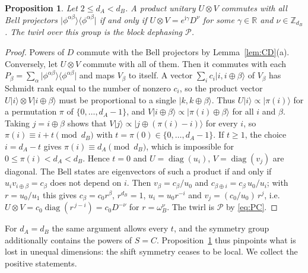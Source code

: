 \documentclass[11pt,a4paper]{article}
\newtheorem{proposition}[theorem]{Proposition}
\theoremstyle{definition}
\theoremstyle{remark}
\newcommand{\ket}[1]{\lvert #1\rangle}
\newcommand{\ketbra}[2]{\lvert #1\rangle\langle #2\rvert}
\newcommand{\dA}{d_A}
\newcommand{\dB}{d_B}
\newcommand{\wB}{\omega_B}
\newcommand{\cP}{\mathcal{P}}
\newcommand{\phib}[2]{\phi^{#1#2}}
\begin{document}
\begin{proposition}\label{prop:sym}
Let $2\le\dA<\dB$. A product unitary $U\otimes V$ commutes with all Bell projectors
$\ketbra{\phib\alpha\beta}{\phib\alpha\beta}$ if and only if
$U\otimes V=e^{\mathrm{i}\gamma}D^{\nu}$ for some $\gamma\in\mathbb{R}$ and
$\nu\in\mathbb{Z}_{\dB}$. The twirl over this group is the block dephasing $\cP$.
\end{proposition}

\begin{proof}
Powers of $D$ commute with the Bell projectors by Lemma~\ref{lem:CD}(a). Conversely, let
$U\otimes V$ commute with all of them. Then it commutes with each
$P_\beta=\sum_\alpha\ketbra{\phib\alpha\beta}{\phib\alpha\beta}$ and maps $V_\beta$ to
itself. A vector $\sum_ic_i\ket{i,i\oplus\beta}$ of $V_\beta$ has Schmidt rank equal to the
number of nonzero $c_i$, so the product vector $U\ket i\otimes V\ket{i\oplus\beta}$ must be
proportional to a single $\ket{k,k\oplus\beta}$. Thus $U\ket i\propto\ket{\pi(i)}$ for a
permutation $\pi$ of $\{0,\dots,\dA-1\}$, and
$V\ket{i\oplus\beta}\propto\ket{\pi(i)\oplus\beta}$ for all $i$ and $\beta$. Taking
$j=i\oplus\beta$ shows that $V\ket j\propto\ket{j\oplus(\pi(i)-i)}$ for every $i$, so
$\pi(i)\equiv i+t \pmod{\dB}$ with $t=\pi(0)\in\{0,\dots,\dA-1\}$. If $t\ge1$, the choice
$i=\dA-t$ gives $\pi(i)\equiv\dA\pmod{\dB}$, which is impossible for
$0\le\pi(i)<\dA<\dB$. Hence $t=0$ and $U=\operatorname{diag}(u_i)$,
$V=\operatorname{diag}(v_j)$ are diagonal. The Bell states are eigenvectors of such a
product if and only if $u_iv_{i\oplus\beta}=c_\beta$ does not depend on $i$. Then
$v_\beta=c_\beta/u_0$ and $c_{\beta\oplus i}=c_\beta\,u_0/u_i$; with $r=u_0/u_1$ this gives
$c_\beta=c_0r^{\beta}$, $r^{\dB}=1$, $u_i=u_0r^{-i}$ and $v_j=(c_0/u_0)\,r^{j}$, i.e.\
$U\otimes V=c_0\operatorname{diag}(r^{\,j-i})=c_0D^{-\nu}$ for $r=\wB^{\nu}$. The twirl is
$\cP$ by \eqref{eq:PC}.
\end{proof}

For $\dA=\dB$ the same argument allows every $t$, and the symmetry group additionally
contains the powers of $S=C$. Proposition~\ref{prop:sym} thus pinpoints what is lost in
unequal dimensions: the shift symmetry ceases to be local. We collect the positive
statements.
\end{document}

